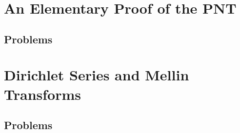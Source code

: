 \documentclass[12pt]{amsbook}
\begin{document}
\chapter{An Elementary Proof of the PNT}



\section{Problems}











\chapter{Dirichlet Series and Mellin Transforms}

\newcommand{\Fhat}{\widehat{F}}
\newcommand{\cconj}[1]{\overline{#1}}



\section{Problems}


















\end{document}

